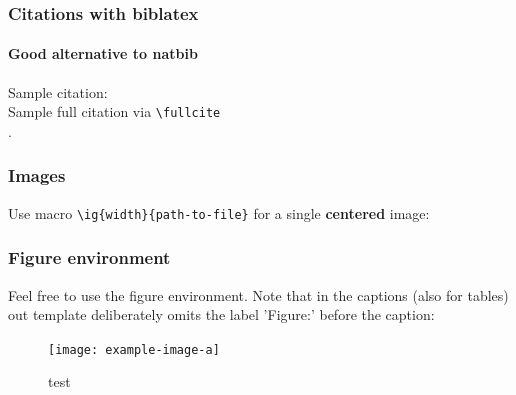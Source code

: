 \documentclass[t,english]{beamer}
\begin{document}
\begin{frame}[fragile]
  \frametitle{Citations with biblatex}
  \framesubtitle{Good alternative to natbib}

  Sample citation:~\cite{BNPS2019}\\
  Sample full citation via \verb|\fullcite|\\[0.5cm]
  .\\[0.5cm]

\end{frame}

\begin{frame}[fragile]
  \frametitle{Images}

  Use macro \verb|\ig{width}{path-to-file}| for a single \textbf{centered} image:
\end{frame}


\begin{frame}
  \frametitle{Figure environment}

  Feel free to use the figure environment. Note that in the captions (also for tables) out template deliberately omits the label 'Figure:' before the caption:

  \begin{figure}[H]
    \texttt{[image: example-image-a]}
    \caption{test}
  \end{figure}

\end{frame}
\end{document}
